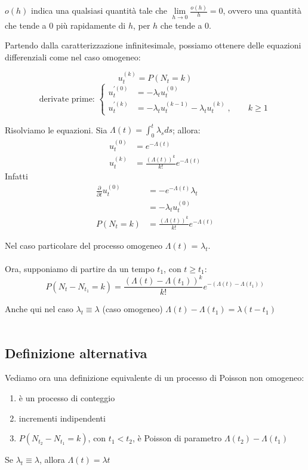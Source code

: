 \documentclass[a4paper,12pt]{book}
\begin{document}
$ o(h) $ indica una qualsiasi quantità tale che $ \lim\limits_{h \to 0} \frac{o(h)}{h} = 0 $, ovvero una quantità che tende a 0 più rapidamente di $ h $, per $ h $ che tende a 0. 

Partendo dalla caratterizzazione infinitesimale, possiamo ottenere delle equazioni differenziali come nel caso omogeneo:

$$ u_t^{(k)} = P(N_t = k) $$
$$ \text{derivate prime: } \begin{cases}
	u_t^{\prime(0)} & = -\lambda_t u_t^{(0)} \\
	u_t^{\prime(k)} & = -\lambda_t u_t^{(k-1)} - \lambda_tu_t^{(k)} \;, \qquad k \ge 1
\end{cases} $$

Risolviamo le equazioni. Sia $\Lambda(t) = \int_{0}^{t} \lambda_s ds$; allora:
\begin{align*}
	u_t^{(0)} & = e^{-\Lambda(t)} \\
	u_t^{(k)} & = \frac{(\Lambda(t))^k}{k!} e^{-\Lambda(t)} 
\end{align*}
Infatti 
\begin{align*}
	\frac{\partial}{\partial t} u_t^{(0)} & = -e^{-\Lambda(t)} \lambda_t \\
	& = -\lambda_t u_t^{(0)} \\
	P(N_t = k) & = \frac{(\Lambda(t))^k}{k!} e^{-\Lambda(t)}
\end{align*}

Nel caso particolare del processo omogeneo $\Lambda(t)$ = $\lambda_t$.
\\
\\
Ora, supponiamo di partire da un tempo $ t_1 $, con $ t \ge t_1 $:
$$ P(N_t - N_{t_1} = k) = \frac{(\Lambda(t) - \Lambda(t_1))^k}{k!} e^{-(\Lambda(t) - \Lambda(t_1))} $$

Anche qui nel caso $\lambda_t \equiv \lambda$ (caso omogeneo) $ \Lambda(t) - \Lambda(t_1) = \lambda(t - t_1) $
\\
\\
\subsection{Definizione alternativa}
Vediamo ora una definizione equivalente di un processo di Poisson non omogeneo:
\begin{enumerate}
	\item è un processo di conteggio
	\item incrementi indipendenti
	\item $ P(N_{t_2} - N_{t_1} = k) $, con $ t_1 < t_2 $, è Poisson di parametro $\Lambda(t_2) - \Lambda(t_1)$
\end{enumerate}
Se $\lambda_t \equiv \lambda$, allora $\Lambda(t) = \lambda t$ 
\end{document}
